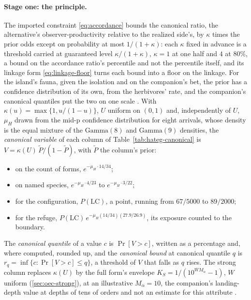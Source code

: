 \documentclass[11pt]{article}
\theoremstyle{definition}
\begin{document}
\paragraph{Stage one: the principle.} The imported constraint \eqref{eq:accordance} bounds the canonical ratio, the alternative's observer-productivity relative to the realized side's, by $\kappa$ times the prior odds except on probability at most $1/(1+\kappa)$: each $\kappa$ fixed in advance is a threshold carried at guaranteed level $\kappa/(1+\kappa)$, $\kappa = 1$ at one half and $4$ at $80\%$, a bound on the accordance ratio's percentile and not the percentile itself, and its linkage form \eqref{eq:linkage-floor} turns each bound into a floor on the linkage. For the island's fauna, given the isolation and on the companion's bet, the prior has a confidence distribution of its own, from the herbivores' rate, and the companion's canonical quantiles put the two on one scale \cite{Nexus}. With $\kappa(u) = \max\{1, u/(1-u)\}$, $U$ uniform on $(0,1)$ and, independently of $U$, $\mu_H$ drawn from the mid-p confidence distribution for eight arrivals, whose density is the equal mixture of the $\mathrm{Gamma}(8)$ and $\mathrm{Gamma}(9)$ densities, the \emph{canonical variable} of each column of Table~\ref{tab:hateg-canonical} is $V = \kappa(U)\, \tilde P/(1 - \tilde P)$, with $\tilde P$ the column's prior:
\begin{itemize}
\item on the count of forms, $e^{-\mu_H \cdot 14/34}$;
\item on named species, $e^{-\mu_H \cdot 4/23}$ to $e^{-\mu_H \cdot 3/22}$;
\item for the configuration, $P(\mathrm{LC})$, a point, running from $67/5000$ to $89/2000$;
\item for the refuge, $P(\mathrm{LC})\, e^{-\mu_H (14/34)(27.9/26.9)}$, its exposure counted to the boundary.
\end{itemize}
The \emph{canonical quantile} of a value $c$ is $\Pr[V > c]$, written as a percentage and, where computed, rounded up, and the \emph{canonical bound} at canonical quantile $q$ is $r_q = \inf\{c : \Pr[V > c] \le q\}$, a threshold of $V$ that falls as $q$ rises. The strong column replaces $\kappa(U)$ by the full form's envelope $K_S = 1/(10^{WM_\alpha} - 1)$, $W$ uniform (\autoref{sec:oec-strong}), at an illustrative $M_\alpha = 10$, the companion's landing-depth value at depths of tens of orders and not an estimate for this attribute \cite{Nexus}.
\end{document}
